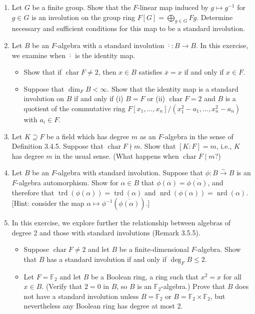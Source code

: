 \documentclass{article}
\theoremstyle{definition}
\begin{document}
\begin{enumerate}
\item[8.] Let $G$ be a finite group. Show that the $F$-linear map induced by $g \mapsto g^{-1}$ for $g \in G$ is an involution on the group ring $F[G] = \bigoplus_{g \in G} Fg$. Determine necessary and sufficient conditions for this map to be a standard involution.

\item[9.] Let $B$ be an $F$-algebra with a standard involution $\overline{\cdot}: B \to B$. In this exercise, we examine when $\overline{\cdot}$ is the identity map.
\begin{itemize}
  \item[(a)] Show that if $\operatorname{char} F \neq 2$, then $x \in B$ satisfies $\overline{x} = x$ if and only if $x \in F$.
  \item[(b)] Suppose that $\dim_F B < \infty$. Show that the identity map is a standard involution on $B$ if and only if (i) $B = F$ or (ii) $\operatorname{char} F = 2$ and $B$ is a quotient of the commutative ring $F[x_1, \dots, x_n]/(x_1^2 - a_1, \dots, x_n^2 - a_n)$ with $a_i \in F$.
\end{itemize}

\item[10.] Let $K \supseteq F$ be a field which has degree $m$ as an $F$-algebra in the sense of Definition 3.4.5. Suppose that $\operatorname{char} F \nmid m$. Show that $[K : F] = m$, i.e., $K$ has degree $m$ in the usual sense. (What happens when $\operatorname{char} F \mid m$?)

\item[11.] Let $B$ be an $F$-algebra with standard involution. Suppose that $\phi: B \xrightarrow{\sim} B$ is an $F$-algebra automorphism. Show for $\alpha \in B$ that $\phi(\overline{\alpha}) = \overline{\phi(\alpha)}$, and therefore that $\operatorname{trd}(\phi(\alpha)) = \operatorname{trd}(\alpha)$ and $\operatorname{nrd}(\phi(\alpha)) = \operatorname{nrd}(\alpha)$. [Hint: consider the map $\alpha \mapsto \phi^{-1}(\overline{\phi(\alpha)})$.]

\item[12.] In this exercise, we explore further the relationship between algebras of degree 2 and those with standard involutions (Remark 3.5.5).
\begin{itemize}
  \item[(a)] Suppose $\operatorname{char} F \neq 2$ and let $B$ be a finite-dimensional $F$-algebra. Show that $B$ has a standard involution if and only if $\deg_F B \leq 2$.
  \item[(b)] Let $F = \mathbb{F}_2$ and let $B$ be a Boolean ring, a ring such that $x^2 = x$ for all $x \in B$. (Verify that $2 = 0$ in $B$, so $B$ is an $\mathbb{F}_2$-algebra.) Prove that $B$ does not have a standard involution unless $B = \mathbb{F}_2$ or $B = \mathbb{F}_2 \times \mathbb{F}_2$, but nevertheless any Boolean ring has degree at most 2.
\end{itemize}


\end{enumerate}
\end{document}
